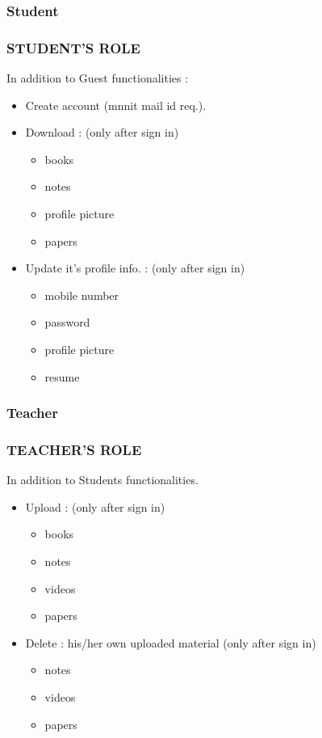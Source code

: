 \documentclass{beamer}
\begin{document}
\subsubsection{Student}
\begin{frame}\frametitle{STUDENT'S ROLE}
\begin{block}{}
\textrm In addition to Guest functionalities : 
	\begin{itemize}
		\item \textrm Create account (mnnit mail id  req.).
		\item \textrm Download : (only after sign in)
\begin{itemize}
\item books
\item notes
\item profile picture
\item papers
\end{itemize}
		\item \textrm Update it's profile info. : (only after sign in)
\begin{itemize}
\item mobile number
\item password
\item profile picture
\item resume
\end{itemize}

	\end{itemize}
\end{block}
\end{frame} 

\subsubsection{Teacher}
\begin{frame}\frametitle{TEACHER'S ROLE}
\begin{block}{}
\textrm In addition to Students functionalities.
	\begin{itemize}
		\item \textrm Upload : (only after sign in)
\begin{itemize}
\item books
\item notes
\item videos
\item papers
\end{itemize}
		\item \textrm Delete : his/her own uploaded material (only after sign in)
\begin{itemize}
\item notes
\item videos
\item papers
\end{itemize}
	\end{itemize}
\end{block}
\end{frame}
\end{document}
